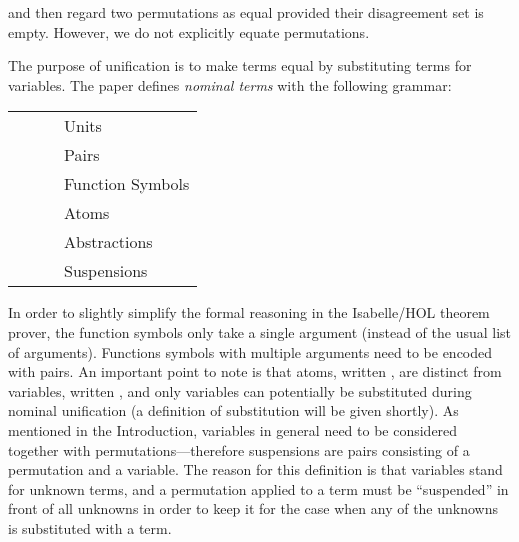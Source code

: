 \begin{isabellebody}
\begin{isamarkuptext}
  \noindent
  and then regard two permutations as equal provided their disagreement set is empty.
  However, we do not explicitly equate permutations.

  The purpose of unification is to make terms equal by substituting terms for variables. 
  The paper \cite{UrbanPittsGabbay04} defines \emph{nominal terms} with the following grammar:

  \begin{center}
  \begin{tabular}{rcll}
  \isa{trm} & \isa{{\isaliteral{3A}{\isacharcolon}}{\isaliteral{3A}{\isacharcolon}}{\isaliteral{3D}{\isacharequal}}} & \isa{{\isaliteral{5C3C6C616E676C653E}{\isasymlangle}}{\isaliteral{5C3C72616E676C653E}{\isasymrangle}}}       & Units\\
                & \isa{{\isaliteral{7C}{\isacharbar}}}   & \isa{{\isaliteral{5C3C6C616E676C653E}{\isasymlangle}}t\isaliteral{5C3C5E697375623E}{}\isactrlisub {\isadigit{1}}{\isaliteral{2C}{\isacharcomma}}\ t\isaliteral{5C3C5E697375623E}{}\isactrlisub {\isadigit{2}}{\isaliteral{5C3C72616E676C653E}{\isasymrangle}}} & Pairs\\
                & \isa{{\isaliteral{7C}{\isacharbar}}}   & \isa{f\ t}   & Function Symbols\\
                & \isa{{\isaliteral{7C}{\isacharbar}}}   & \isa{a}     & Atoms\\
                & \isa{{\isaliteral{7C}{\isacharbar}}}   & \isa{a{\isaliteral{2E}{\isachardot}}t}   & Abstractions\\
                & \isa{{\isaliteral{7C}{\isacharbar}}}   & \isa{{\isaliteral{5C3C70693E}{\isasympi}}{\isaliteral{5C3C63646F743E}{\isasymcdot}}X}   & Suspensions\\
  \end{tabular}
  \end{center}

  \noindent
  In order to slightly simplify the formal reasoning in the Isabelle/HOL
  theorem prover, the function symbols only take a single argument (instead of
  the usual list of arguments). Functions symbols with multiple arguments need
  to be encoded with pairs. An important point to note is that atoms,
  written , are distinct from variables, written , and only variables can potentially be substituted during nominal
  unification (a definition of substitution will be given shortly). As mentioned in the
  Introduction,
  variables in general need to be considered together with
  permutations---therefore suspensions are pairs consisting of a permutation and
  a variable. The reason for this definition is that variables stand for unknown 
  terms, and a permutation applied to a term must be 
  ``suspended'' in front of all unknowns in order to
  keep it for the case when any of the unknowns is substituted with a term.
  


\end{isamarkuptext}
\end{isabellebody}
